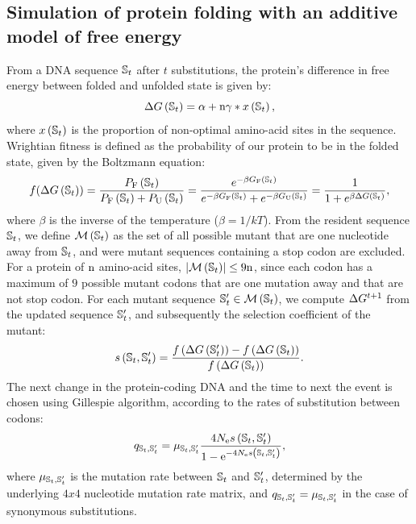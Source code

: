 \documentclass{article}
\begin{document}
\subsection*{Simulation of protein folding with an additive model of free energy}
\label{MatMet:folding}
From a DNA sequence $\mathbb{S}_{t}$ after $t$ substitutions, the protein's difference in free energy between folded and unfolded state is given by:
\begin{equation*}
\Delta G\left(\mathbb{S}_{t}\right) = \alpha + \text{n} \gamma * x\left(\mathbb{S}_{t}\right), 
\end{equation*}
where $x\left(\mathbb{S}_{t}\right)$ is the proportion of non-optimal amino-acid sites in the sequence.
Wrightian fitness is defined as the probability of our protein to be in the folded state, given by the Boltzmann equation: 
\begin{equation}
f(\Delta G\left(\mathbb{S}_{t}\right)) = \dfrac{P_{\mathrm{F}}\left(\mathbb{S}_{t}\right)}{P_{\mathrm{F}}\left(\mathbb{S}_{t}\right) + P_{\mathrm{U}}\left(\mathbb{S}_{t}\right)} = \dfrac{e^{-\beta G_{\mathrm{F}}\left(\mathbb{S}_{t}\right) }}{e^{-\beta G_{\mathrm{F}} \left(\mathbb{S}_{t}\right) } + e^{-\beta G_{\mathrm{U}}\left(\mathbb{S}_{t}\right) }} = \dfrac{1}{1 + e^{\beta \Delta G\left(\mathbb{S}_{t}\right) }}, 
\end{equation}
where $\beta$ is the inverse of the temperature ($\beta=1/kT$).
From the resident sequence $\mathbb{S}_{t}$, we define $\mathcal{M}\left(\mathbb{S}_{t}\right)$ as the set of all possible mutant that are one nucleotide away from $\mathbb{S}_{t}$, and were mutant sequences containing a stop codon are excluded.
For a protein of $\text{n}$ amino-acid sites, $\left| \mathcal{M}\left(\mathbb{S}_{t}\right) \right| \leq 9 \text{n}$, since each codon has a maximum of $9$ possible mutant codons that are one mutation away and that are not stop codon.
For each mutant sequence $\mathbb{S}_{t}' \in \mathcal{M}\left(\mathbb{S}_{t}\right)$, we compute $\Delta G^{t+1}$ from the updated sequence $\mathbb{S}_{t}'$, and subsequently the selection coefficient of the mutant:
\begin{equation}
s \left( \mathbb{S}_{t},\mathbb{S}_{t}'\right) = \dfrac{ f\left( \Delta G \left(\mathbb{S}_{t}'\right) \right) - f\left( \Delta G \left(\mathbb{S}_{t}\right) \right)}{f\left( \Delta G \left(\mathbb{S}_{t}\right) \right)}.
\end{equation}
The next change in the protein-coding DNA and the time to next the event is chosen using Gillespie algorithm, according to the rates of substitution between codons:
\begin{equation}
q_{\mathbb{S}_{t}, \mathbb{S}_{t}'} = \mu_{\mathbb{S}_{t}, \mathbb{S}_{t}'} \dfrac{4 N_{\mathrm{e}} s \left( \mathbb{S}_{t},\mathbb{S}_{t}'\right)}{1 - \mathrm{e}^{-4 N_{\mathrm{e}} s \left( \mathbb{S}_{t},\mathbb{S}_{t}'\right)}}, 
\end{equation}
where $\mu_{\mathbb{S}_{t}, \mathbb{S}_{t}'}$ is the mutation rate between $\mathbb{S}_{t}$ and $\mathbb{S}_{t}'$, determined by the underlying $4x4$ nucleotide mutation rate matrix, and ${q_{\mathbb{S}_{t}, \mathbb{S}_{t}'}} = \mu_{\mathbb{S}_{t}, \mathbb{S}_{t}'}$ in the case of synonymous substitutions.
\end{document}
